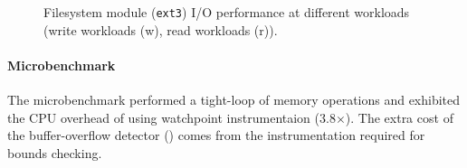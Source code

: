 \documentclass[letterpaper,twocolumn,10pt]{article}
\let\ORIGcaption\caption
\renewcommand{\caption}[2][\compressedcaption]{%
\def\compressedcaption{#2}%
    \vspace{-12pt}%
    \ORIGcaption[#1]{#2}%
    \vspace{-12pt}}
\begin{document}
\begin{figure}
\ORIGcaption{\label{fig:iozone-workload-overhead} Filesystem module (\texttt{ext3}) I/O performance at different workloads (write workloads (w), read workloads (r)).}
\end{figure}



\paragraph{Microbenchmark} %
The microbenchmark performed a tight-loop of memory operations and exhibited the CPU overhead of using watchpoint instrumentaion (3.8{\footnotesize$\times$}). The extra cost of the buffer-overflow detector () comes from the instrumentation required for bounds checking.





\end{document}
